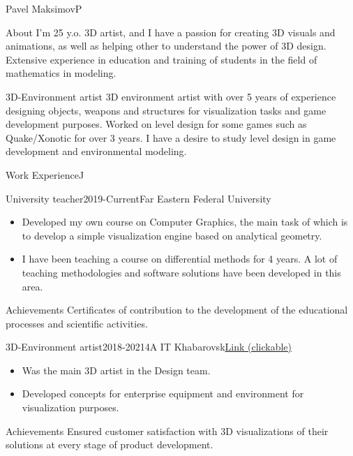 \documentclass[10pt]{extarticle}
\begin{document}
	\begin{centralpart}{Pavel Maksimov}{P}{}
		\begin{titleblock}{About}{}{}{}
			I'm 25 y.o. 3D artist, and I have a passion for creating 3D visuals and animations, as well as helping other to understand the power of 3D design. Extensive experience in education and training of students in the field of mathematics in modeling.
		\end{titleblock}

		\begin{titleblock}{3D-Environment artist}{}{}{}
			3D environment artist with over 5 years of experience designing objects, weapons and structures for visualization tasks and game development purposes. Worked on level design for some games such as Quake/Xonotic for over 3 years. I have a desire to study level design in game development and environmental modeling.
		\end{titleblock}
	\end{centralpart}

	\setlength{\currentpos}{\getposy+5pt}
	
	\begin{centralpart}{Work Experience}{J}{}
		\begin{titleblock}{University teacher}{2019-Current}{Far Eastern Federal University}{}
			\begin{itemize}[label=$\circ$]
				\item Developed my own course on Computer Graphics, the main task of which is to develop a simple visualization engine based on analytical geometry.
				\item I have been teaching a course on differential methods for 4 years. A lot of teaching methodologies and software solutions have been developed in this area.
			\end{itemize}
		\end{titleblock}
		\begin{additionalblock}{Achievements}
			Certificates of contribution to the development of the educational processes and scientific activities.
		\end{additionalblock}
		\begin{titleblock}{3D-Environment artist}{2018-2021}{4A IT Khabarovsk}{\href{https://4ait.ru/}{Link (clickable)}}
			\begin{itemize}[label=$\circ$]
				\item Was the main 3D artist in the Design team.
				\item Developed concepts for enterprise equipment and environment for visualization purposes.
			\end{itemize}
		\end{titleblock}
		\begin{additionalblock}{Achievements}
			Ensured customer satisfaction with 3D visualizations of their solutions at every stage of product development.
		\end{additionalblock}
	\end{centralpart}
\end{document}
